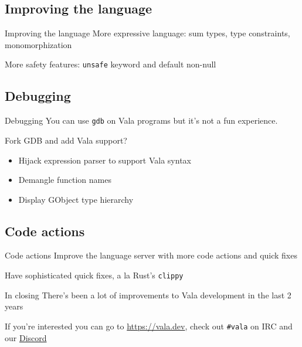 \documentclass[t]{beamer}
\begin{document}
\subsection{Improving the language}
\begin{frame}[c]{Improving the language}
More expressive language: sum types, type constraints, monomorphization

More safety features: \texttt{unsafe} keyword and default non-null
\end{frame}

\subsection{Debugging}
\begin{frame}[c]{Debugging}
You can use \texttt{gdb} on Vala programs but it's not a fun experience.

Fork GDB and add Vala support?
\begin{itemize}
    \item Hijack expression parser to support Vala syntax
    \item Demangle function names
    \item Display GObject type hierarchy
\end{itemize}
\end{frame}

\subsection{Code actions}
\begin{frame}[c]{Code actions}
Improve the language server with more code actions and quick fixes

Have sophisticated quick fixes, a la Rust's \texttt{clippy}
\end{frame}

\begin{frame}[c]{In closing}
There's been a lot of improvements to Vala development in the last 2 years

If you're interested you can go to \url{https://vala.dev}, check out \texttt{\#vala} on IRC and our \href{https://discord.com/invite/YFAzjSVHt7}{Discord}
\end{frame}
\end{document}
